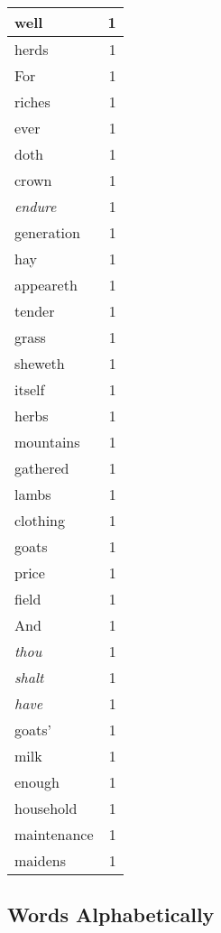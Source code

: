 \begin{center}
\begin{longtable}{l|r}
well & 1\\ \hline 
herds & 1\\ \hline 
For & 1\\ \hline 
riches & 1\\ \hline 
ever & 1\\ \hline 
doth & 1\\ \hline 
crown & 1\\ \hline 
\emph{endure} & 1\\ \hline 
generation & 1\\ \hline 
hay & 1\\ \hline 
appeareth & 1\\ \hline 
tender & 1\\ \hline 
grass & 1\\ \hline 
sheweth & 1\\ \hline 
itself & 1\\ \hline 
herbs & 1\\ \hline 
mountains & 1\\ \hline 
gathered & 1\\ \hline 
lambs & 1\\ \hline 
clothing & 1\\ \hline 
goats & 1\\ \hline 
price & 1\\ \hline 
field & 1\\ \hline 
And & 1\\ \hline 
\emph{thou} & 1\\ \hline 
\emph{shalt} & 1\\ \hline 
\emph{have} & 1\\ \hline 
goats' & 1\\ \hline 
milk & 1\\ \hline 
enough & 1\\ \hline 
household & 1\\ \hline 
maintenance & 1\\ \hline 
maidens & 1\\ \hline 
\end{longtable}  
\end{center}  


  
\normalsize  

  
  


\subsection{Words Alphabetically}

